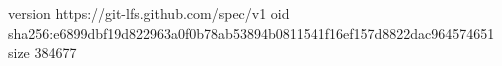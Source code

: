 version https://git-lfs.github.com/spec/v1
oid sha256:e6899dbf19d822963a0f0b78ab53894b0811541f16ef157d8822dac964574651
size 384677
